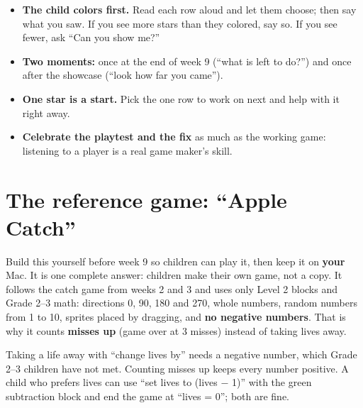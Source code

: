 \documentclass[track=junior,level=2,teacher]{kidscode}
\begin{document}
\begin{tip}
\begin{itemize}[itemsep=2pt]
  \item \textbf{The child colors first.} Read each row aloud and let them choose; then say what you saw.
        If you see more stars than they colored, say so. If you see fewer, ask \enquote{Can you show me?}
  \item \textbf{Two moments:} once at the end of week 9 (\enquote{what is left to do?}) and once after
        the showcase (\enquote{look how far you came}).
  \item \textbf{One star is a start.} Pick the one row to work on next and help with it right away.
  \item \textbf{Celebrate the playtest and the fix} as much as the working game: listening to a
        player is a real game maker's skill.
\end{itemize}
\end{tip}

\section{The reference game: \enquote{Apple Catch}}
Build this yourself before week 9 so children can play it, then keep it on \textbf{your} Mac. It is
one complete answer: children make their own game, not a copy. It follows the catch game from weeks 2
and 3 and uses only Level 2 blocks and Grade 2--3 math: directions 0, 90, 180 and 270, whole numbers,
random numbers from 1 to 10, sprites placed by dragging, and \textbf{no negative numbers}. That is why
it counts \textbf{misses up} (game over at 3 misses) instead of taking lives away.

\begin{teachernote}
Taking a life away with \enquote{change lives by} needs a negative number, which Grade 2--3 children
have not met. Counting misses up keeps every number positive. A child who prefers lives can use
\enquote{set lives to (lives $-$ 1)} with the green subtraction block and end the game at
\enquote{lives = 0}; both are fine.
\end{teachernote}
\end{document}
